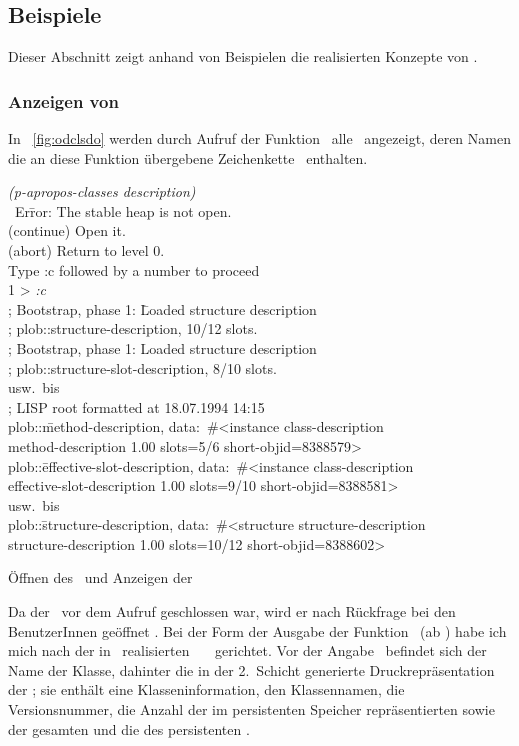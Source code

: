 \subsection{Beispiele}
%
Dieser Abschnitt zeigt anhand von Beispielen die realisierten Konzepte
von \plob.
%
\subsubsection{Anzeigen von \protect\clsdo[en]}
%
In \figurename~\ref{fig:odclsdo} werden durch Aufruf der Funktion
\ alle \clsdo[e]\ angezeigt, deren Namen die
an diese Funktion \"{u}bergebene Zeichenkette
\ enthalten. 
%
\begin{listing}%
\listener\label{enu:odclsdopa}
{\em(p-apropos-classes \dq{}description\dq)}\\
\oi\ Er\=ror: The stable heap is not open.\\
   (continue) Open it.\\
   (abort) Return to level 0.\\
Type :c followed by a number to proceed\\
\errlistener\label{enu:odclsdoer} 1 > {\em:c}\\
; Bootstrap, phase 1: \=Loaded structure description\\
; \>plob::structure-description, 10/12 slots.\\
; Bootstrap, phase 1: Loaded structure description\\
; \>plob::structure-slot-description, 8/10 slots.\\ 
{\rm usw.\ bis}\\
; LISP root formatted at 18.07.1994 14:15\\
plob::\=method-description, data:\ \#<instance class-description\\
\oii  \>method-description 1.00 slots=5/6 short-objid=8388579>\\
plob::\=effective-slot-description, data:\ \#<instance class-description\\
      \>effective-slot-description 1.00 slots=9/10 short-objid=8388581>\\
{\rm usw.\ bis}\\
plob::\=structure-description, data:\ \#<structure structure-description\\
      \>structure-description 1.00 slots=10/12 short-objid=8388602>
\caption{\"{O}ffnen des \protect\sh\ und Anzeigen der \protect\clsdo[e]}%
\label{fig:odclsdo}%
\end{listing}%
%
Da der \sh\ vor dem Aufruf geschlossen war, wird er nach R\"{u}ckfrage
bei den BenutzerInnen ge\"{o}ffnet \oi. Bei der Form der Ausgabe der
Funktion \ (ab \oii) habe ich mich nach der in
\lw\ realisierten \fn\ \ \ gerichtet. Vor
der Angabe \ befindet sich der Name der Klasse, dahinter
die in der 2.~Schicht generierte Druckrepr\"{a}sentation der \clsdo[e];
sie enth\"{a}lt eine Klasseninformation, den Klassennamen, die
Versionsnummer, die Anzahl der im persistenten Speicher
repr\"{a}sentierten sowie der gesamten
\Slt[s]\/ und die \sobjid\/ des persistenten \clsdo[es].
%
